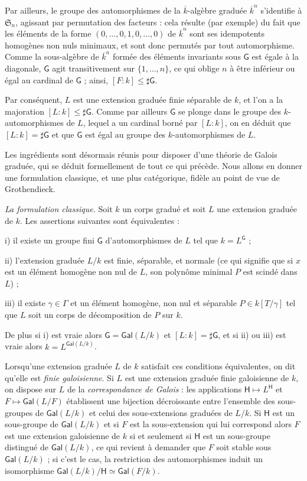 \documentclass[10pt,leqno]{article}
\renewcommand{\leq}{\leqslant}
\newcommand{\got}[1]{{\mathfrak #1}}
\newcommand{\deux}[1]{\refstepcounter{subsection}\label{#1}\medskip\noindent {\bf (\thesubsection)}\hspace{.1cm}}
\newcommand{\trois}[1]{\refstepcounter{subsubsection}\label{#1}\medskip\noindent {\bf
    (\thesubsubsection)}\hspace{.1cm}}
\begin{document}
Par ailleurs, le groupe des automorphismes de la $\overline k$-algèbre graduée $\overline k^n$ s'identifie à $\got S_n$, agissant par permutation des facteurs : cela résulte (par exemple) du fait que les éléments de la forme $(0,\ldots,0,1,0,\ldots, 0)$ de $\overline k^n$ sont ses idempotents homogènes non nuls minimaux, et sont donc permutés par tout automorphisme. Comme la sous-algèbre de $\overline k^n$ formée des éléments invariants sous $\mathsf G$ est égale à la diagonale, $\mathsf G$ agit transitivement sur $\{1,\ldots, n\}$, ce qui oblige $n$ à être inférieur ou égal au cardinal de $\mathsf G$ ; ainsi, $[F:k]\leq \sharp \mathsf G$. 

\medskip
Par conséquent, $L$ est une extension graduée finie séparable de $k$, et l'on a la majoration $[L:k]\leq \sharp\mathsf G$. Comme par ailleurs $\mathsf G$ se  plonge dans le groupe des $k$-automorphismes de $L$, lequel a un cardinal borné par $[L:k]$, on en déduit que $[L:k]=\sharp\mathsf G$ et que $\mathsf G$ est égal au groupe des $k$-automorphismes de $L$. 

\deux{thogalgrad} Les ingrédients sont désormais réunis pour disposer d'une théorie de Galois graduée, qui se déduit formellement de tout ce qui précède. Nous allons en donner une formulation classique, et une plus catégorique, fidèle au point de vue de Grothendieck. 

\trois{theogalgradclass} {\em La formulation classique.} Soit $k$ un corps gradué et soit $L$ une extension graduée de $k$. Les assertions suivantes sont équivalentes : 

\medskip
i) il existe un groupe fini $\mathsf G$ d'automorphismes de $L$ tel que $k=L^{\mathsf G}$ ; 

ii) l'extension graduée $L/k$ est finie, séparable, et normale (ce qui signifie que si $x$ est un élément homogène non nul de $L$, son polynôme minimal $P$ est scindé dans $L$) ; 

iii) il existe $\gamma\in \Gamma$ et un élément homogène, non nul et séparable $P\in k[T/\gamma]$ tel que $L$ soit un corps de décomposition de $P$ sur $k$. 


\medskip
De plus si i) est vraie alors $\mathsf G=\mathsf {Gal}(L/k)$ et $[L:k]=\sharp \mathsf G$, et si ii) ou iii) est vraie alors $k=L^{\mathsf{Gal}(L/k)}$. 

\medskip
Lorsqu'une extension graduée $L$ de $k$ satisfait ces conditions équivalentes, on dit qu'elle est {\em finie galoisienne}. Si $L$ est une extension graduée finie galoisienne de $k$, on dispose sur $L$ de la {\em correspondance de Galois} : les applications $\mathsf H\mapsto L^{\mathsf H}$ et $F\mapsto \mathsf{Gal}(L/F)$ établissent une bijection décroissante entre l'ensemble des sous-groupes de $\mathsf{Gal}(L/k)$ et celui des sous-extensions graduées de $L/k$. Si $\mathsf H$ est un  sous-groupe de $\mathsf{Gal}(L/k)$ et si $F$ est la sous-extension qui lui correspond alors $F$ est une extension galoisienne de $k$ si et seulement si $\mathsf H$ est un sous-groupe distingué de $\mathsf{Gal}(L/k)$, ce qui revient à demander que $F$ soit stable sous $\mathsf{Gal}(L/k)$ ; si c'est le cas, la restriction des automorphismes induit un isomorphisme $\mathsf{Gal}(L/k)/\mathsf H\simeq \mathsf{Gal}(F/k)$. 
\end{document}
